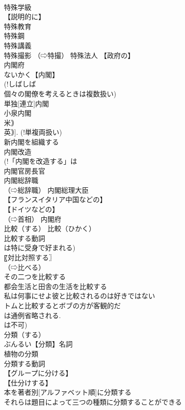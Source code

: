 \documentclass[8pt]{extreport}
\begin{document}
\begin{CJK}{UTF8}{min}
\\	特殊学級 
\\	【説明的に】
\\	特殊教育 
\\	特殊鋼 
\\	特殊講義 
\\	特殊撮影 （⇨特撮） 特殊法人 【政府の】
\\	内閣府		
\\	ないかく【内閣】 
\\	(!しばしば 
\\	個々の閣僚を考えるときは複数扱い) 
\\	単独[連立]内閣 
\\	小泉内閣 
\\	米｠ 
\\	英｠]. (!単複両扱い) 
\\	新内閣を組織する 
\\	内閣改造 
\\	(!「内閣を改造する」は 
\\	内閣官房長官 
\\	内閣総辞職 
\\	（⇨総辞職） 内閣総理大臣 
\\	【フランスイタリア中国などの】
\\	【ドイツなどの】
\\	（⇨首相） 内閣府 
\\	比較（する）		比較（ひかく） 
\\	比較する動詞 
\\	は特に受身で好まれる) 
\\	〖対比対照する〗
\\	（⇨比べる） 
\\	その二つを比較する 
\\	都会生活と田舎の生活を比較する 
\\	私は何事にせよ彼と比較されるのは好きではない 
\\	トムと比較するとボブの方が客観的だ 
\\	は通例省略される. 
\\	は不可) 
\\	分類（する）		
\\	ぶんるい【分類】名詞 
\\	植物の分類 
\\	分類する動詞 
\\	【グループに分ける】
\\	【仕分けする】
\\	本を著者別[アルファベット順]に分類する 
\\	それらは題目によって三つの種類に分類することができる 

\end{CJK}
\end{document}
